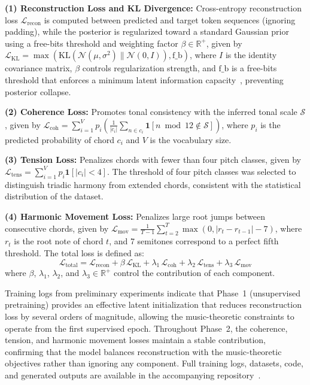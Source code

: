 \documentclass[conference]{IEEEtran}
\begin{document}
\textbf{(1) Reconstruction Loss and KL Divergence:} Cross-entropy reconstruction loss $\mathcal{L}_{\text{recon}}$ is computed between predicted and target token sequences (ignoring padding), while the posterior is regularized toward a standard Gaussian prior using a free-bits threshold and weighting factor $\beta \in \mathbb{R}^{+}$, given by 
{\small $\mathcal{L}_{\text{KL}}=
\max\!\left(
\text{KL}\!\left(\mathcal{N}(\mu,\sigma^2)\|
\mathcal{N}(0,I)\right),
\text{f\_b}
\right)$}, 
where $I$ is the identity covariance matrix, $\beta$ controls regularization strength, and $\text{f\_b}$ is a free-bits threshold that enforces a minimum latent information capacity~\cite{kingma2016freebits}, preventing posterior collapse.

\textbf{(2) Coherence Loss:}
Promotes tonal consistency with the inferred tonal scale $\mathcal{S}$, given by 
{\small $\mathcal{L}_{\text{coh}}=
\sum_{i=1}^{V} p_i
\left(
\frac{1}{|c_i|}
\sum_{n \in c_i}
\mathbf{1}[n\bmod12\notin\mathcal{S}]
\right)$}, 
where $p_i$ is the predicted probability of chord $c_i$ and $V$ is the vocabulary size.

\textbf{(3) Tension Loss:}
Penalizes chords with fewer than four pitch classes, given by 
{\small $\mathcal{L}_{\text{tens}}=
\sum_{i=1}^{V}
p_i\mathbf{1}[|c_i|<4]$}.
The threshold of four pitch classes was selected to distinguish
triadic harmony from extended chords, consistent with the
statistical distribution of the dataset.

\textbf{(4) Harmonic Movement Loss:}
Penalizes large root jumps between consecutive chords, given by 
{\small $\mathcal{L}_{\text{mov}}=
\frac{1}{T-1}
\sum_{t=2}^{T}
\max(0,|r_t-r_{t-1}|-7)$}, 
where $r_t$ is the root note of chord $t$, and 7 semitones correspond to a perfect fifth threshold.
The total loss is defined as:
\begin{equation}
\mathcal{L}_{\text{total}} =
\mathcal{L}_{\text{recon}}
+ \beta\,\mathcal{L}_{\text{KL}}
+ \lambda_1\,\mathcal{L}_{\text{coh}}
+ \lambda_2\,\mathcal{L}_{\text{tens}}
+ \lambda_3\,\mathcal{L}_{\text{mov}}
\label{eq:total_loss}
\end{equation}
where $\beta$, $\lambda_1$, $\lambda_2$, and $\lambda_3 \in \mathbb{R}^{+}$ control the contribution of each component.

Training logs from preliminary experiments indicate that Phase~1 (unsupervised pretraining) provides an effective latent initialization that reduces reconstruction loss by several orders of magnitude, allowing the music-theoretic constraints to operate from the first supervised epoch. Throughout Phase~2, the coherence, tension, and harmonic movement losses maintain a stable contribution, confirming that the model balances reconstruction with the music-theoretic objectives rather than ignoring any component. Full training logs, datasets, code, and generated outputs are available in the accompanying repository~\cite{sclRepo}.
\end{document}

